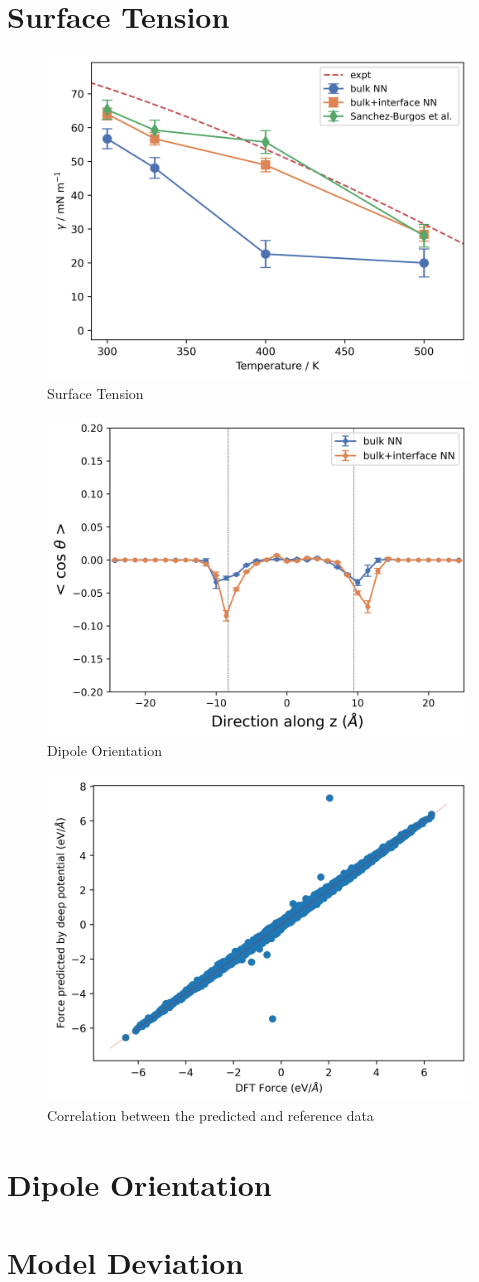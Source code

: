 \section{Surface Tension}
\begin{figure}[h!]
  \centering
  \includegraphics[width=0.7\linewidth]{images/surface_tension.png}
  \caption{Surface Tension}
\end{figure}
\begin{figure}[h!]
  \centering
  \includegraphics[width=0.5\linewidth]{images/dipole_dist.png}
  \caption{Dipole Orientation}
\end{figure}

\begin{figure}[h!]
  \centering
  \includegraphics[width=0.5\linewidth]{images/force_correlation.png}
  \caption{Correlation between the predicted and reference data}
\end{figure}

\section{Dipole Orientation}
\section{Model Deviation}

\clearpage
